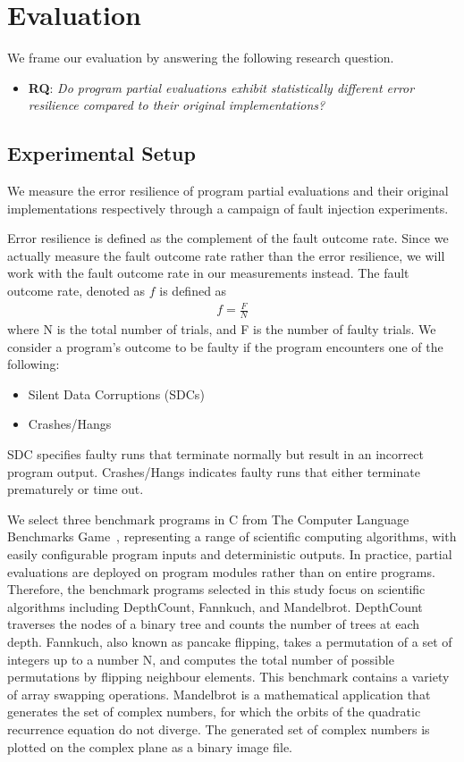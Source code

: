 \section{Evaluation}
\label{sec:evaluation}

We frame our evaluation by answering the following research question. 

\begin{itemize}
\item {\bf RQ}: \textit{Do program partial evaluations exhibit statistically different error resilience compared to their original implementations?}
\end{itemize}

\subsection{Experimental Setup}
\label{sec:exp.setup}

We measure the error resilience of program partial evaluations and their original implementations respectively through a campaign of fault injection experiments. 

Error resilience is defined as the complement of the fault outcome rate.
Since we actually measure the fault outcome rate rather than the error resilience, we will work with the fault outcome rate in our measurements instead.
The fault outcome rate, denoted as $f$ is defined as 
\begin{align*}
f = \frac{F}{N}
\end{align*}
where N is the total number of trials, and F is the number of faulty trials.
We consider a program's outcome to be faulty if the program encounters one of the following:
\begin{itemize}
\item Silent Data Corruptions (SDCs) 
\item Crashes/Hangs
\end{itemize}

SDC specifies faulty runs that terminate normally but result in an incorrect program output. 
Crashes/Hangs indicates faulty runs that either terminate prematurely or time out.

\bigbreak

We select three benchmark programs in C from The Computer Language Benchmarks Game~\cite{BenchmarkSuite}, representing a range of scientific computing algorithms, with easily configurable program inputs and deterministic outputs.
In practice, partial evaluations are deployed on program modules rather than on entire programs. 
Therefore, the benchmark programs selected in this study focus on scientific algorithms including DepthCount, Fannkuch, and Mandelbrot.
DepthCount traverses the nodes of a binary tree and counts the number of trees at each depth.
Fannkuch, also known as pancake flipping, takes a permutation of a set of integers up to a number N, and computes the total number of possible permutations by flipping neighbour elements.
This benchmark contains a variety of array swapping operations.
Mandelbrot is a mathematical application that generates the set of complex numbers, for which the orbits of the quadratic recurrence equation do not diverge.
The generated set of complex numbers is plotted on the complex plane as a binary image file.

